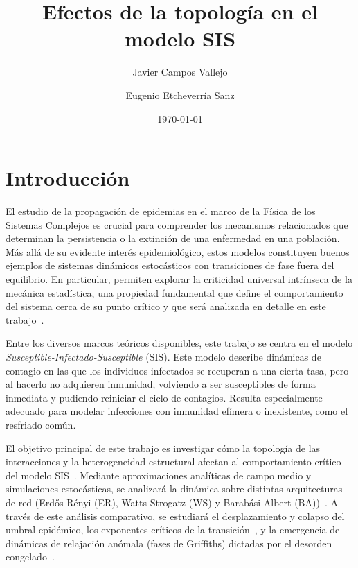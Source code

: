 \documentclass[%
reprint,
amsmath,amssymb,
aps,
]{revtex4-2}
\begin{document}
	\renewcommand{\andname}{y}
	\title{Efectos de la topología en el modelo SIS}
	
	\author{Javier Campos Vallejo}
	\author{Eugenio Etcheverría Sanz}
	
	\date{\today}
	
	\begin{abstract}
	\end{abstract}
	
	\maketitle
	
	\section{\label{sec:introduccion}Introducción}
	El estudio de la propagación de epidemias en el marco de la Física de los Sistemas Complejos es crucial para comprender los mecanismos relacionados que determinan la persistencia o la extinción de una enfermedad en una población. Más allá de su evidente interés epidemiológico, estos modelos constituyen buenos ejemplos de sistemas dinámicos estocásticos con transiciones de fase fuera del equilibrio. En particular, permiten explorar la criticidad universal intrínseca de la mecánica estadística, una propiedad fundamental que define el comportamiento del sistema cerca de su punto crítico y que será analizada en detalle en este trabajo~\cite{PastorSatorras2015,Dorogovtsev2008,Albert2002,Odor2004}.
	
	Entre los diversos marcos teóricos disponibles, este trabajo se centra en el modelo \textit{Susceptible-Infectado-Susceptible} (SIS). Este modelo describe dinámicas de contagio en las que los individuos infectados se recuperan a una cierta tasa, pero al hacerlo no adquieren inmunidad, volviendo a ser susceptibles de forma inmediata y pudiendo reiniciar el ciclo de contagios. Resulta especialmente adecuado para modelar infecciones con inmunidad efímera o inexistente, como el resfriado común.~\cite{PastorSatorras2015}
	
	
	El objetivo principal de este trabajo es investigar cómo la topología de las interacciones y la heterogeneidad estructural afectan al comportamiento crítico del modelo SIS~\cite{Roig2026}. Mediante aproximaciones analíticas de campo medio y simulaciones estocásticas, se analizará la dinámica sobre distintas arquitecturas de red (Erdős-Rényi (ER), Watts-Strogatz (WS) y  Barabási-Albert (BA))~\cite{Dorogovtsev2008, Albert2002}. A través de este análisis comparativo, se estudiará el desplazamiento y colapso del umbral epidémico, los exponentes críticos de la transición~\cite{Odor2004}, y la emergencia de dinámicas de relajación anómala (fases de Griffiths) dictadas por el desorden congelado~\cite{Muñoz2010,Noest1986}.
	
\end{document}
